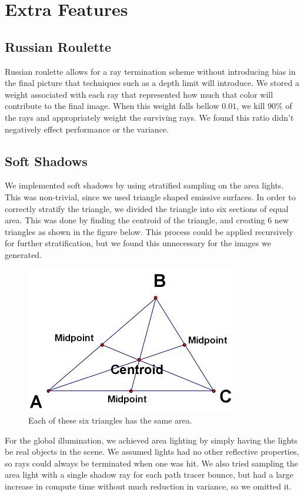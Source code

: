 \documentclass[11pt]{article}
\begin{document}
\section{Extra Features}

\subsection{Russian Roulette}
Russian roulette allows for a ray termination scheme without introducing bias in the final picture that techniques such as a depth limit will introduce. We stored a weight associated with each ray that represented how much that color will contribute to the final image. When this weight falls bellow $0.01$, we kill $90\%$ of the rays and appropriately weight the surviving rays. We found this ratio didn't negatively effect performance or the variance.

\subsection{Soft Shadows}
We implemented soft shadows by using stratified sampling on the area lights. This was non-trivial, since we used triangle shaped emissive surfaces. In order to correctly stratify the triangle, we divided the triangle into six sections of equal area. This was done by finding the centroid of the triangle, and creating 6 new triangles as shown in the figure below. This process could be applied recursively for further stratification, but we found this unnecessary for the images we generated.

\begin{figure}
	\begin{center}
		\includegraphics[width=.5\linewidth]{figs/centroid}
		\caption{Each of these six triangles has the same area.}
	\end{center}
\end{figure}

For the global illumination, we achieved area lighting by simply having the lights be real objects in the scene. We assumed lights had no other reflective properties, so rays could always be terminated when one was hit. We also tried sampling the area light with a single shadow ray for each path tracer bounce, but had a large increase in compute time without much reduction in variance, so we omitted it.
\end{document}
